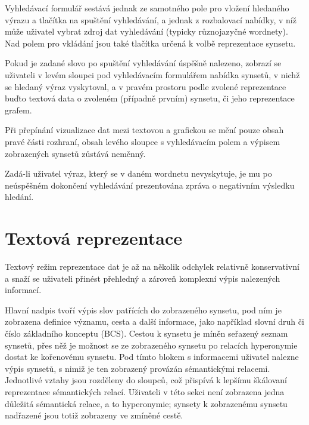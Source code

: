 \documentclass[a4paper, 11pt, oneside]{book}
\begin{document}
				Vyhledávací formulář sestává jednak ze samotného pole pro vložení hledaného výrazu a tlačítka na spuštění vyhledávání, a jednak z rozbalovací nabídky, v níž může uživatel vybrat zdroj dat vyhledávání (typicky různojazyčné wordnety). Nad polem pro vkládání jsou také tlačítka určená k volbě reprezentace synsetu.

				Pokud je zadané slovo po spuštění vyhledávání úspěšně nalezeno, zobrazí se uživateli v levém sloupci pod vyhledávacím formulářem nabídka synsetů, v nichž se hledaný výraz vyskytoval, a v pravém prostoru podle zvolené reprezentace buďto textová data o zvoleném (případně prvním) synsetu, či jeho reprezentace grafem.

				Při přepínání vizualizace dat mezi textovou a grafickou se mění pouze obsah pravé části rozhraní, obsah levého sloupce s vyhledávacím polem a výpisem zobrazených synsetů zůstává neměnný.

				Zadá-li uživatel výraz, který se v daném wordnetu nevyskytuje, je mu po neúspěšném dokončení vyhledávání prezentována zpráva o negativním výsledku hledání. 

			\section{Textová reprezentace}

				Textový režim reprezentace dat je až na několik odchylek relativně konservativní a snaží se uživateli přinést přehledný a zároveň komplexní výpis nalezených informací. 

				Hlavní nadpis tvoří výpis slov patřících do zobrazeného synsetu, pod ním je zobrazena definice významu, cesta a další informace, jako například slovní druh či číslo základního konceptu (BCS). Cestou k synsetu je míněn seřazený seznam synsetů, přes něž je možnost se ze zobrazeného synsetu po relacích hyperonymie dostat ke kořenovému synsetu. Pod tímto blokem s informacemi uživatel nalezne výpis synsetů, s nimiž je ten zobrazený provázán sémantickými relacemi. Jednotlivé vztahy jsou rozděleny do sloupců, což přispívá k lepšímu škálovaní reprezentace sémantických relací. Uživateli v této sekci není zobrazena jedna důležitá sémantická relace, a to hyperonymie; synsety k zobrazenému synsetu nadřazené jsou totiž zobrazeny ve zmíněné cestě.
\end{document}
